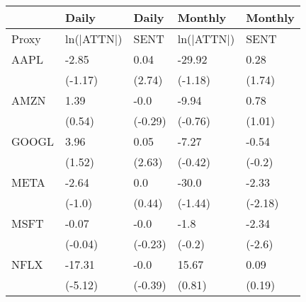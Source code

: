 \begin{tabular}{lllll}
\toprule
{} &       Daily &    Daily &     Monthly &  Monthly \\
\midrule
Proxy &  ln(|ATTN|) &     SENT &  ln(|ATTN|) &     SENT \\
AAPL  &       -2.85 &     0.04 &      -29.92 &     0.28 \\
      &     (-1.17) &   (2.74) &     (-1.18) &   (1.74) \\
AMZN  &        1.39 &     -0.0 &       -9.94 &     0.78 \\
      &      (0.54) &  (-0.29) &     (-0.76) &   (1.01) \\
GOOGL &        3.96 &     0.05 &       -7.27 &    -0.54 \\
      &      (1.52) &   (2.63) &     (-0.42) &   (-0.2) \\
META  &       -2.64 &      0.0 &       -30.0 &    -2.33 \\
      &      (-1.0) &   (0.44) &     (-1.44) &  (-2.18) \\
MSFT  &       -0.07 &     -0.0 &        -1.8 &    -2.34 \\
      &     (-0.04) &  (-0.23) &      (-0.2) &   (-2.6) \\
NFLX  &      -17.31 &     -0.0 &       15.67 &     0.09 \\
      &     (-5.12) &  (-0.39) &      (0.81) &   (0.19) \\
\bottomrule
\end{tabular}
